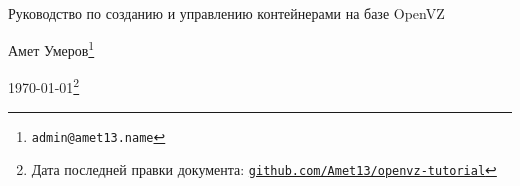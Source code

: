 
{~}\bigskip %

\begin{center}
\Huge{Руководство по созданию и управлению контейнерами на базе OpenVZ} %

\vspace{1em}
\Large{Амет Умеров}\footnote{\texttt{admin@amet13.name}} %

\Large{\today}\footnote{Дата последней правки документа: \texttt{\href{https://github.com/Amet13/openvz-tutorial}{github.com/Amet13/openvz-tutorial}}} %
\end{center}

\clearpage %
